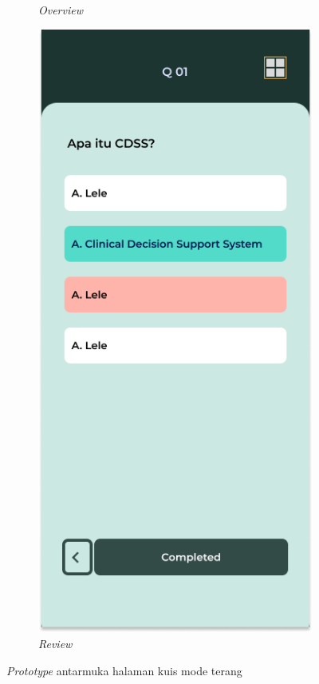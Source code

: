 \begin{figure}[H]
\begin{subfigure}[b]{0.23\textwidth}
	  \caption{\textit{Overview}}
	  \label{fig:pilihNomorDark}
	\end{subfigure}
	\begin{subfigure}[b]{0.23\textwidth}
		\centering
	  \includegraphics[width=\linewidth]{contents/chapter-3/images/HF-kuis3-dt.png}
	  \caption{\textit{Review}}
	  \label{fig:KoreksiDark}
	\end{subfigure}
	\caption{\textit{Prototype} antarmuka halaman kuis mode terang}
	\label{Fig:FeatureSetQuizDark}
\end{figure}
